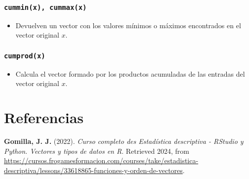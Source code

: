 \documentclass[
]{article}
\providecommand{\tightlist}{%
  \setlength{\itemsep}{0pt}\setlength{\parskip}{0pt}}
\begin{document}
\hypertarget{cumminx-cummaxx}{%
\subsubsection{\texorpdfstring{\texttt{cummin(x),\ cummax(x)}}{cummin(x), cummax(x)}}\label{cumminx-cummaxx}}

\begin{itemize}
\tightlist
\item
  Devuelven un vector con los valores mínimos o máximos encontrados en
  el vector original \(x\).
\end{itemize}

\hypertarget{cumprodx}{%
\subsubsection{\texorpdfstring{\texttt{cumprod(x)}}{cumprod(x)}}\label{cumprodx}}

\begin{itemize}
\tightlist
\item
  Calcula el vector formado por los productos acumuladas de las entradas
  del vector original \(x\).
\end{itemize}

\pagebreak

\hypertarget{referencias}{%
\section{Referencias}\label{referencias}}

\textbf{Gomilla, J. J.} (2022). \emph{Curso completo des Estadística
descriptiva - RStudio y Python. Vectores y tipos de datos en R}.
Retrieved 2024, from
\url{https://cursos.frogamesformacion.com/courses/take/estadistica-descriptiva/lessons/33618865-funciones-y-orden-de-vectores}.
\end{document}

